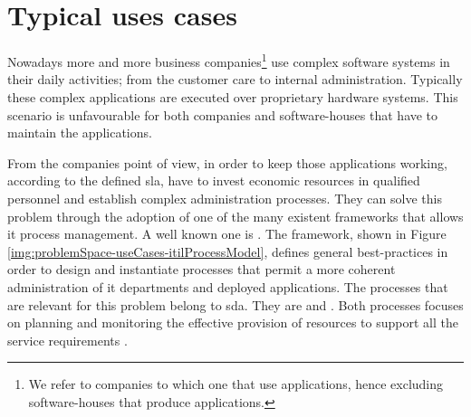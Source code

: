 %
%
\section[Typical use cases]{Typical uses cases}
\label{sec:problemSpace-useCases}
Nowadays more and more business companies\footnote{We refer to companies to which one that use
applications, hence excluding software-houses that produce applications.} use complex software systems
in their daily activities; from the customer care to internal administration. Typically these complex
applications are executed over proprietary hardware systems. This scenario is unfavourable for both
companies and software-houses that have to maintain the applications.

From the companies point of view, in order to keep those applications working, according
to the defined \ac{sla}, have to invest economic resources in qualified personnel and establish complex
administration processes. They can solve this problem through the adoption of one of the many existent
frameworks that allows \acs{it} process management. A well known one is .
The framework, shown in Figure \ref{img:problemSpace-useCases-itilProcessModel}, defines general
best-practices in order to design and instantiate processes that permit a more coherent 
administration of \acs{it} departments and deployed applications. The processes that are relevant for
this problem belong to \ac{sda}. They are   and . Both processes
focuses on planning and monitoring the effective provision of resources to support all the service
requirements \cite{availabilityCapacityProcesses}.

